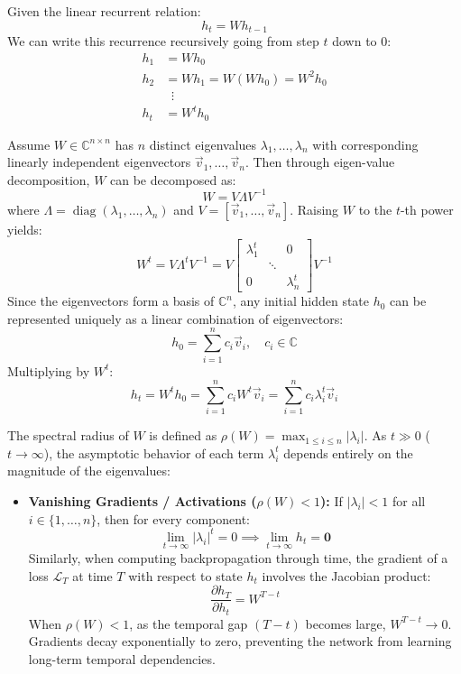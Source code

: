 \documentclass[11pt,english]{article}
\begin{document}
\begin{enumerate}[resume]
Given the linear recurrent relation:
\[
h_t = W h_{t-1}
\]
We can write this recurrence recursively going from step $t$ down to $0$:
\begin{align*}
    h_1 &= W h_0 \\
    h_2 &= W h_1 = W(W h_0) = W^2 h_0 \\
    &\;\;\vdots \\
    h_t &= W^t h_0
\end{align*}

Assume $W \in \mathbb{C}^{n \times n}$ has $n$ distinct eigenvalues $\lambda_1, \ldots, \lambda_n$ with corresponding linearly independent eigenvectors $\vec{v}_1, \ldots, \vec{v}_n$. Then through eigen-value decomposition, $W$ can be decomposed as:
\[
W = V \Lambda V^{-1}
\]
where $\Lambda = \operatorname{diag}(\lambda_1, \ldots, \lambda_n)$ and $V = [\vec{v}_1, \ldots, \vec{v}_n]$. Raising $W$ to the $t$-th power yields:
\[
W^t = V \Lambda^t V^{-1} = V \begin{bmatrix} \lambda_1^t & & 0 \\ & \ddots & \\ 0 & & \lambda_n^t \end{bmatrix} V^{-1}
\]
Since the eigenvectors form a basis of $\mathbb{C}^n$, any initial hidden state $h_0$ can be represented uniquely as a linear combination of eigenvectors:
\[
h_0 = \sum_{i=1}^n c_i \vec{v}_i, \quad c_i \in \mathbb{C}
\]
Multiplying by $W^t$:
\[
h_t = W^t h_0 = \sum_{i=1}^n c_i W^t \vec{v}_i = \sum_{i=1}^n c_i \lambda_i^t \vec{v}_i
\]

The spectral radius of $W$ is defined as $\rho(W) = \max_{1 \le i \le n} |\lambda_i|$. As $t \gg 0$ ($t \to \infty$), the asymptotic behavior of each term $\lambda_i^t$ depends entirely on the magnitude of the eigenvalues:

\begin{itemize}
    \item \textbf{Vanishing Gradients / Activations ($\rho(W) < 1$):}
    If $|\lambda_i| < 1$ for all $i \in \{1, \ldots, n\}$, then for every component:
    \[
    \lim_{t \to \infty} |\lambda_i|^t = 0 \implies \lim_{t \to \infty} h_t = \mathbf{0}
    \]
    Similarly, when computing backpropagation through time, the gradient of a loss $\mathcal{L}_T$ at time $T$ with respect to state $h_t$ involves the Jacobian product:
    \[
    \frac{\partial h_T}{\partial h_t} = W^{T-t}
    \]
    When $\rho(W) < 1$, as the temporal gap $(T - t)$ becomes large, $W^{T-t} \to 0$. Gradients decay exponentially to zero, preventing the network from learning long-term temporal dependencies.


\end{itemize}
\end{enumerate}
\end{document}
